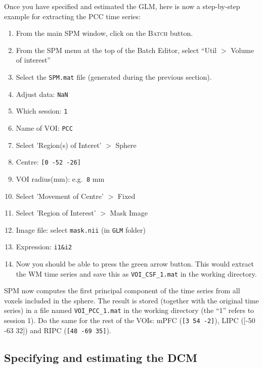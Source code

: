 Once you have specified and estimated the GLM, here is now a step-by-step example for extracting the PCC time series:
\begin{enumerate}
 \item From the main SPM window, click on the \textsc{Batch} button.
 \item From the SPM menu at the top of the Batch Editor, select ``Util $>$ Volume of interest''
 \item Select the \texttt{SPM.mat} file (generated during the previous section).
 \item Adjust data: \texttt{NaN}
 \item Which session: \texttt{1}
 \item Name of VOI: \texttt{PCC}
 \item Select 'Region(s) of Interet' $>$ Sphere
 \item Centre: \texttt{[0 -52 -26]}
 \item VOI radius(mm): e.g.\texttt{ 8} mm
 \item Select 'Movement of Centre' $>$ Fixed
 \item Select 'Region of Interest' $>$ Mask Image
 \item Image file: select \texttt{mask.nii} (in \texttt{GLM} folder)
 \item Expression: \texttt{i1\&i2}
 \item Now you should be able to press the green arrow button. This would extract the WM time series and save this as  \texttt{VOI\_CSF\_1.mat} in the working directory.
\end{enumerate}
SPM now computes the first principal component of the time series from all voxels included in the sphere. The result is stored (together with the original time series) in a file named \texttt{VOI\_PCC\_1.mat} in the working directory (the ``1'' refers to session 1). Do the same for the rest of the VOIs: mPFC (\texttt{[3 54 -2]}), LIPC ({[-50 -63 32]}) and RIPC (\texttt{[48 -69 35]}).

\subsection{Specifying and estimating the DCM}

